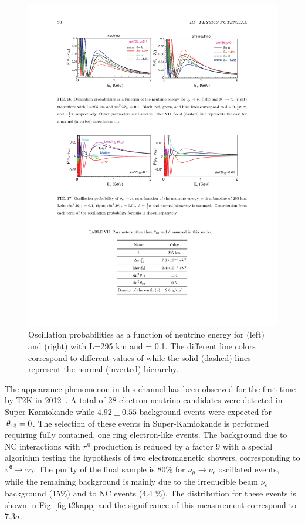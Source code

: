 \begin{figure} [htbp!]
\begin{center}
\includegraphics[width=14cm]{figures/papp_prob.pdf}
\caption{\label{fig:t2kappnub} Oscillation probabilities as a function of neutrino energy for \papp (left) and \pappb (right) with L=295 km and \stot = 0.1. The different line colors correspond to different values of \dcp while the solid (dashed) lines represent the normal (inverted) hierarchy.   }
\end{center}
\end{figure}


The \nue appearance phenomenon in this channel has been observed for the first time by T2K in 2012~\cite{Abe:2013hdq}. A total of 28 electron neutrino candidates were detected in Super-Kamiokande while $4.92\pm0.55$ background events were expected for $\textrm \,\theta_{13}=0$. The selection of these events in Super-Kamiokande is performed requiring fully contained, one ring electron-like events. The background due to NC interactions with $\pi^0$ production is reduced by a factor 9 with a special algorithm testing the hypothesis of two electromagnetic showers, corresponding to $\pi⁰ \rightarrow \gamma \gamma$. The purity of the final sample is 80\% for $\nu_\mu \rightarrow \nu_e$ oscillated events, while the remaining background is mainly due to the irreducible beam $\nu_e$ background (15\%) and to NC events (4.4 \%). 
The \ptheta distribution for these events is shown in Fig~\ref{fig:t2kapp} and the significance of this measurement correspond to $7.3\sigma$. 

